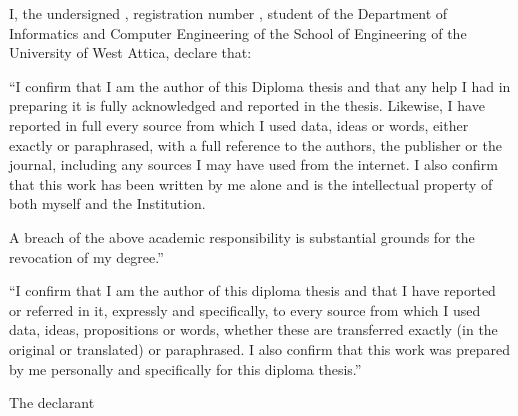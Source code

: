 %

\begin{center}
\end{center}

\vspace{1.5em}

I, the undersigned \thAuthorEN, registration number \thAM, student of the
Department of Informatics and Computer Engineering of the School of
Engineering of the University of West Attica, declare that:

``I confirm that I am the author of this Diploma thesis and that any
help I had in preparing it is fully acknowledged and reported in the
thesis. Likewise, I have reported in full every source from which I used
data, ideas or words, either exactly or paraphrased, with a full
reference to the authors, the publisher or the journal, including any
sources I may have used from the internet. I also confirm that this work
has been written by me alone and is the intellectual property of both
myself and the Institution.

A breach of the above academic responsibility is substantial grounds for
the revocation of my degree.''

``I confirm that I am the author of this diploma thesis and that I have
reported or referred in it, expressly and specifically, to every source
from which I used data, ideas, propositions or words, whether these are
transferred exactly (in the original or translated) or paraphrased. I
also confirm that this work was prepared by me personally and
specifically for this diploma thesis.''

\begin{center}
The declarant
\end{center}

\begin{center}
\thAuthorEN
\end{center}
